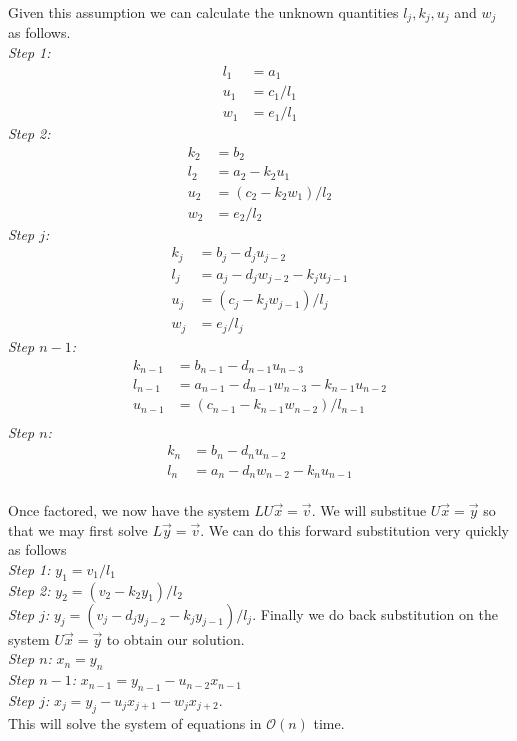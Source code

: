\documentclass[12pt]{article}
\begin{document}
	Given this assumption we can calculate the unknown quantities $l_j, k_j, u_j$ and $w_j$ as follows. \\
	\emph{Step 1:} 
	\begin{align*}
		l_1 &= a_1 \\
		u_1 &= c_1/l_1 \\
		w_1 & = e_1/l_1
	\end{align*}
	\emph{Step 2:} 
	\begin{align*}
		k_2 &= b_2 \\
		l_2 &= a_2 - k_2u_1 \\
		u_2 &= (c_2 - k_2w_1)/l_2 \\
		w_2 & = e_2/l_2
	\end{align*}
	\emph{Step $j$:} 
	\begin{align*}
		k_j &= b_j - d_ju_{j-2} \\
		l_j &= a_j - d_jw_{j-2} - k_ju_{j-1} \\
		u_j &= (c_j - k_jw_{j-1})/l_j \\
		w_j & = e_j/l_j
	\end{align*}
	\emph{Step $n-1$:} 
	\begin{align*}
		k_{n-1} &= b_{n-1} - d_{n-1}u_{n-3} \\
		l_{n-1} &= a_{n-1} - d_{n-1}w_{n-3} - k_{n-1}u_{n-2} \\
		u_{n-1} &= (c_{n-1} - k_{n-1}w_{n-2})/l_{n-1} \\
	\end{align*}
	\emph{Step $n$:} 
	\begin{align*}
		k_n &= b_n - d_nu_{n-2} \\
		l_n &= a_n - d_nw_{n-2} - k_nu_{n-1} \\
	\end{align*}
	
	Once factored, we now have the system $LU\vec{x}=\vec{v}$. We will substitue $U\vec{x}=\vec{y}$ so that we may first solve $L\vec{y}=\vec{v}$. We can do this forward substitution very quickly as follows\\
	\emph{Step 1:} $y_1 = v_1/l_1$ \\
	\emph{Step 2:} $y_2 = (v_2-k_2y_1)/l_2$ \\
	\emph{Step $j$:} $y_j = (v_j - d_jy_{j-2} - k_jy_{j-1})/l_j$.
	Finally we do back substitution on the system $U\vec{x}= \vec{y}$ to obtain our solution.\\
	\emph{Step $n$:} $x_n = y_n$ \\
	\emph{Step $n-1$:} $x_{n-1} = y_{n-1} - u_{n-2}x_{n-1}$ \\
	\emph{Step $j$:} $x_j = y_j - u_jx_{j+1} - w_jx_{j+2}$. \\
	This will solve the system of equations in $\mathcal{O}(n)$ time.
	
\end{document}
